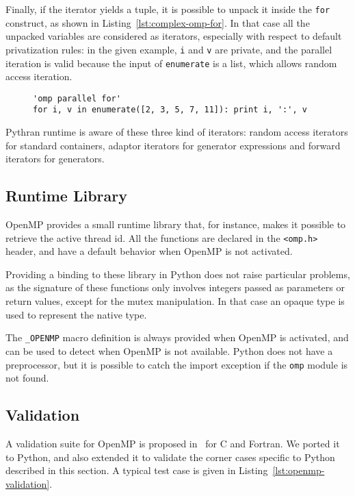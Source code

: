 \documentclass{llncs}
\begin{document}
Finally, if the iterator yields a tuple, it is possible to unpack it inside the
\texttt{for} construct, as shown in Listing~\ref{lst:complex-omp-for}. In that case
all the unpacked variables are considered as iterators, especially with respect
to default privatization rules: in the given example, \texttt{i} and \texttt{v}
are private, and the parallel iteration is valid because the input of
\texttt{enumerate} is a list, which allows random access iteration.

\begin{figure}
    \begin{lstlisting}[label={lst:complex-omp-for}, caption={Parallel
    loop in Pythran with tuple unpacking.}]
'omp parallel for'
for i, v in enumerate([2, 3, 5, 7, 11]): print i, ':', v
  \end{lstlisting}
\end{figure}

Pythran runtime is aware of these three kind of iterators: random access
iterators for standard containers, adaptor iterators for generator expressions
and forward iterators for generators.

\subsection{Runtime Library}

OpenMP provides a small runtime library that, for instance, makes it possible to
retrieve the active thread id. All the functions are declared in the
\texttt{<omp.h>} header, and have a default behavior when OpenMP is not
activated.

Providing a binding to these library in Python does not raise particular
problems, as the signature of these functions only involves integers passed as
parameters or return values, except for the mutex manipulation. In that case an
opaque type is used to represent the native type.

The \texttt{\_OPENMP} macro definition is always provided when OpenMP is
activated, and can be used to detect when OpenMP is not available. Python does
not have a preprocessor, but it is possible to catch the import exception if the
\texttt{omp} module is not found.

\subsection{Validation}

A validation suite for OpenMP is proposed in~\cite{wang2012} for C and Fortran.
We ported it to Python, and also extended it to validate the corner cases
specific to Python described in this section. A typical test case is given in
Listing~\ref{lst:openmp-validation}.
\end{document}
